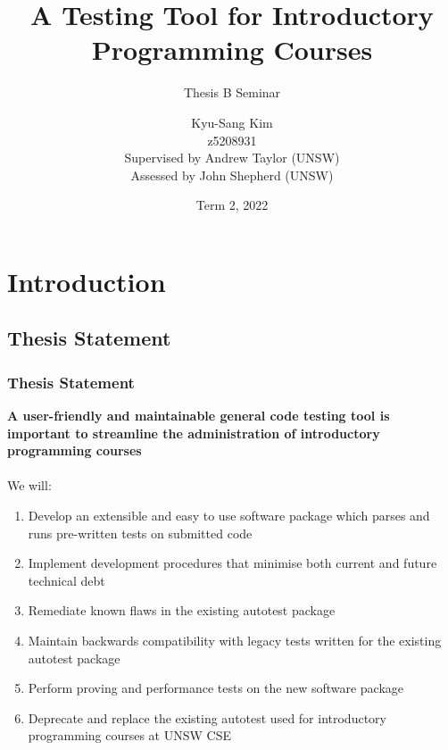 \documentclass[xcolor]{beamer}
\author[Kyu-Sang Kim]{Kyu-Sang Kim\\z5208931\\\vspace{0.2cm}Supervised by Andrew Taylor (UNSW)\\Assessed by John Shepherd (UNSW)}
\title[Thesis B Seminar]{A Testing Tool for Introductory Programming Courses}
\subtitle{Thesis B Seminar}
\date{Term 2, 2022}
\begin{document}
\begin{frame}
	\titlepage
\end{frame}


\section{Introduction}
\subsection{Thesis Statement}
\begin{frame}
	\frametitle{Thesis Statement}
	\textbf{A user-friendly and maintainable general code testing tool is important to streamline the administration of introductory programming courses}
	\\~\\
		\pause
	We will:
		\pause
	\begin{enumerate}
		\item Develop an extensible and easy to use software package which parses and runs pre-written tests on submitted code
			\pause
		\item Implement development procedures that minimise both current and future technical debt
			\pause
		\item Remediate known flaws in the existing autotest package
			\pause
		\item Maintain backwards compatibility with legacy tests written for the existing autotest package
			\pause
		\item Perform proving and performance tests on the new software package
			\pause
		\item Deprecate and replace the existing autotest used for introductory programming courses at UNSW CSE
	\end{enumerate}
\end{frame}
\end{document}
